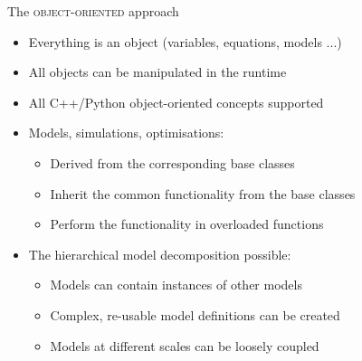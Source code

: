 \documentclass[compress,newPxFont,sthlmFooter]{beamer}
\begin{document}
\begin{frame}{The \textsc{object-oriented} approach}
\begin{itemize}
  \item Everything is an \alert{object} (variables, equations, models ...)
  \item All objects can be \alert{manipulated} in \alert{the runtime}
  \item \alert{All} C++/Python \alert{object-oriented concepts supported}
  \item Models, simulations, optimisations:
     \begin{itemize}
        \item \alert{Derived from} the corresponding \alert{base classes}
        \item \alert{Inherit} the \alert{common functionality} from the base classes
        \item Perform the \alert{functionality} in \alert{overloaded functions}
     \end{itemize}
  \item The \alert{hierarchical model decomposition} possible:
    \begin{itemize}
        \item Models can contain instances of other models
        \item Complex, re-usable model definitions can be created
        \item Models at different scales can be loosely coupled %
    \end{itemize}
\end{itemize}
\end{frame}
\end{document}
